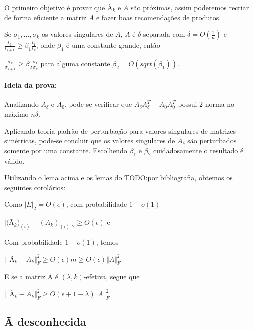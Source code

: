 \documentclass[a4paper,10pt]{article}
\begin{document}
O primeiro objetivo é provar que Ã$_k$ e $A$ são próximas, assim poderemos recriar de forma eficiente a matriz $A$ e fazer boas recomendações de produtos. 

\begin{lema}
 Se $\sigma_1, ..., \sigma_k$ os valores singulares de $A$, $A$ é $\delta$-separada com $\delta = O(\frac{1}{n})$ e $\frac{t_k}{t_{k+1}} \geq \beta_1 \frac{t_1}{t_k}$, onde $\beta_1$ é uma constante grande, então 

$\frac{\sigma_k}{\sigma_{k+1}} \geq \beta_2 \frac{\sigma_1}{\sigma_{k}}$
para alguma constante $\beta_2 = O (sqrt(\beta_1))$.

\end{lema}
\paragraph{Ideia da prova:} Analizando $A_\delta$ e $A_0$, pode-se verificar que $A_\delta A_\delta^T - A_0 A_0^T$ possui 2-norma no máximo $n \delta$.

Aplicando teoria padrão de perturbação para valores singulares de matrizes simétricas, pode-se concluir que os valores singulares de $A_\delta$ são perturbados somente por uma constante. Escolhendo $\beta_1$ e $\beta_2$ cuidadosamente o resultado é válido. 


Utilizando o lema acima e os lemas do TODO:por bibliografia, obtemos os seguintes corolários:
  
\begin{coro} 
Como $\vert E \vert_2 = O(\epsilon)$, com probabilidade  $ 1 - o(1) $

$\vert ($Ã$_k)_{(i)} - (A_k)_{(i)}\vert_2 \geq O(\epsilon)$ e \end{coro}

\begin{coro} Com probabilidade $1- o(1)$, temos 

$\Vert$ Ã$_k - A_k\Vert^2_F \geq O(\epsilon)m \geq O(\epsilon)\Vert A \Vert^2_F $
\end{coro}

E se a matriz A é $(\lambda, k)$-efetiva, segue que 
\begin{coro}

$\Vert$ Ã$_k - A_k\Vert^2_F \geq  O(\epsilon + 1 - \lambda)\Vert A \Vert^2_F $
\end{coro}

\subsection{Ã desconhecida}
\end{document}
